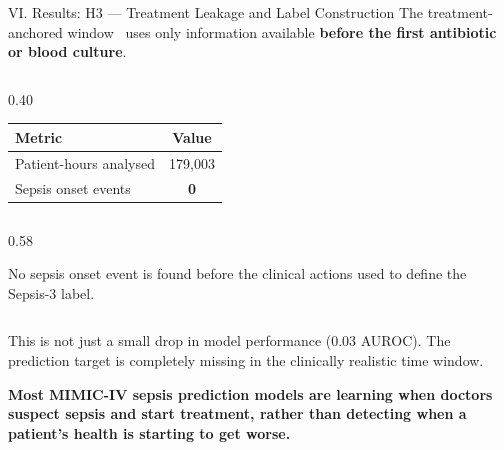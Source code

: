 \begin{frame}{VI. Results: H3 --- Treatment Leakage and Label Construction}
The treatment-anchored window~\cite{kamran2024evaluation} uses only
information available \textbf{before the first antibiotic or blood culture}.

\vspace{6pt}
\begin{atucols}[c]

\begin{column}{0.40\textwidth}
\begin{center}\tablestyle
\begin{tabular}{lc}
\toprule
\textbf{Metric} & \textbf{Value} \\
\midrule
Patient-hours analysed & 179,003 \\
Sepsis onset events    & \textbf{0} \\
\bottomrule
\end{tabular}
\end{center}
\end{column}

\begin{column}{0.58\textwidth}
\begin{alertblock}{}
  No sepsis onset event is found before the clinical actions used to define
  the Sepsis-3 label.
\end{alertblock}
\end{column}

\end{atucols}

\vspace{6pt}
This is not just a small drop in model performance (0.03 AUROC). The
prediction target is completely missing in the clinically realistic time
window.

\vspace{4pt}
\textbf{Most MIMIC-IV sepsis prediction models are learning when doctors
suspect sepsis and start treatment, rather than detecting when a patient's
health is starting to get worse.}
\end{frame}


